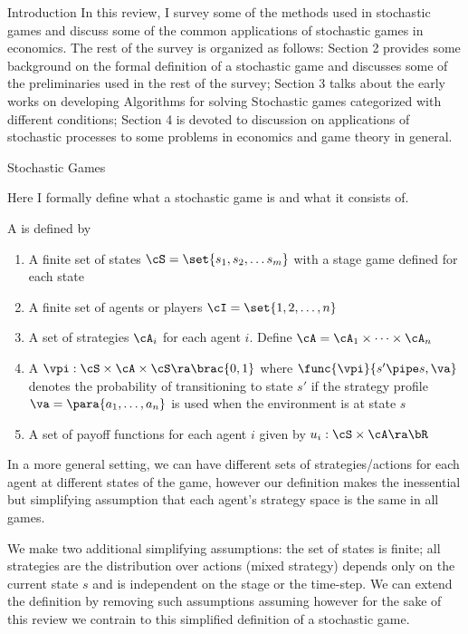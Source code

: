 \documentclass{article}
\begin{document}
\begin{psection}{Introduction}
	In this review, I survey some of the methods used in stochastic games and
	discuss some of the common applications of stochastic games in economics.
	The rest of the survey is organized as follows: Section 2 provides some
	background on the formal definition of a stochastic game and discusses some
	of the preliminaries used in the rest of the survey; Section 3 talks about
	the early works on developing Algorithms for solving Stochastic games
	categorized with different conditions; Section 4 is devoted to discussion
	on applications of stochastic processes to some problems in economics and
	game theory in general.

\end{psection}

\begin{psection}{Stochastic Games}

	Here I formally define what a stochastic game is and what it consists of.

	\begin{definition}
		A  is defined by
		\begin{enumerate}
			\item A finite set of states $\cS = \set{s_1, s_2, \dots s_m}$ with a stage game defined for each state
			\item A finite set of agents or players $\cI = \set{1, 2, \dots, n}$
			\item A set of strategies $\cA_i$ for each agent $i$. Define $\cA = \cA_1 \times \dots \times \cA_n$
			\item A  $\vpi : \cS \times \cA \times \cS \ra \brac{0, 1}$ where $\func{\vpi}{s' \pipe s, \va}$ denotes the probability of transitioning to state $s'$ if the strategy profile $\va = \para{a_1, \dots, a_n}$ is used when the environment is at state $s$
			\item A set of payoff functions for each agent $i$ given by $u_i : \cS \times \cA \ra \bR$
		\end{enumerate}
	\end{definition}

	In a more general setting, we can have different sets of strategies/actions for each agent at different states of the game, however our definition makes the inessential but simplifying assumption that each agent's strategy space is the same in all games.

	We make two additional simplifying assumptions: the set of states is finite; all strategies are  \ie the distribution over actions (mixed strategy) depends only on the current state $s$ and is independent on the stage or the time-step. We can extend the definition by removing such assumptions assuming however for the sake of this review we contrain to this simplified definition of a stochastic game.


\end{psection}
\end{document}
